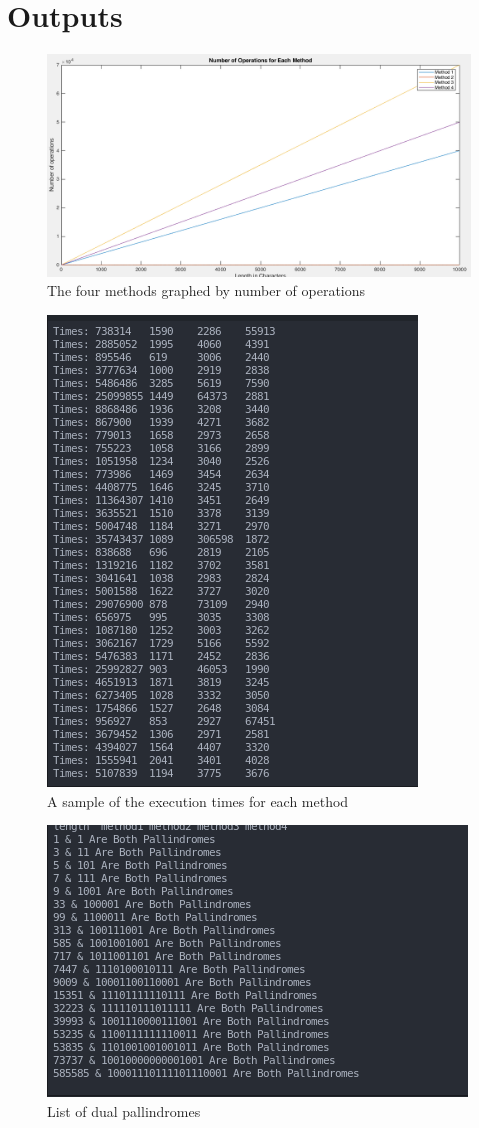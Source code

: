 \documentclass{article}
\begin{document}
	\section{Outputs}
		\begin{figure}[h!]
			\centering
			\includegraphics[width=\textwidth]{1.png}
			\caption{The four methods graphed by number of operations}
		\end{figure}
		\begin{figure}
			\centering
			\includegraphics{2.png}
			\caption{A sample of the execution times for each method}
		\end{figure}
		\begin{figure}
			\centering
			\includegraphics{3.png}
			\caption{List of dual pallindromes}
		\end{figure}
	
	
\end{document}
